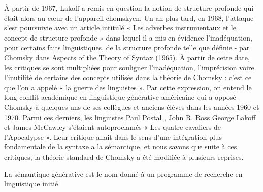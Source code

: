  À partir de 1967, Lakoff a remis en question la notion de structure profonde qui était alors au cœur de l’appareil chomskyen. Un an plus tard, en 1968, l'attaque s’est poursuivie avec un article intitulé « Les adverbes instrumentaux et le concept de structure profonde » dans lequel il a mis en évidence l’inadéquation, pour certains faits linguistiques, de la structure profonde telle que définie - par Chomsky dans Aspects of the Theory of Syntax (1965). À partir de cette date, les critiques se sont multipliées pour souligner l’inadéquation, l’imprécision voire l’inutilité de certains des concepts utilisés dans la théorie de Chomsky : c’est ce que l’on a appelé « la guerre des linguistes ». Par cette expression, on entend le long conflit académique en linguistique générative américaine qui a opposé Chomsky à quelques-uns de ses collègues et anciens élèves dans les années 1960 et 1970. Parmi ces derniers, les linguistes Paul Postal , John R. Ross George Lakoff et James McCawley s’étaient autoproclamés « Les quatre cavaliers de l’Apocalypse ». Leur critique allait dans le sens d’une intégration plus fondamentale de la syntaxe a la sémantique, et nous savons que suite à ces critiques, la théorie standard de Chomsky a été modifiée à plusieurs reprises.\par

 La sémantique générative est le nom donné à un programme de recherche en linguistique initié\par


